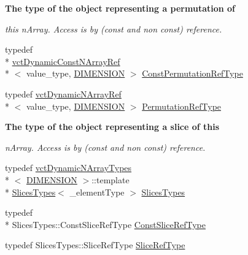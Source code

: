 \begin{Indent}{\bf The type of the object representing a permutation of}\par
{\em this n\-Array. Access is by (const and non const) reference. }\begin{DoxyCompactItemize}
\item 
typedef \\*
\hyperlink{classvct_dynamic_const_n_array_ref}{vct\-Dynamic\-Const\-N\-Array\-Ref}\\*
$<$ value\-\_\-type, \hyperlink{classvct_dynamic_const_n_array_base_a815ac316ebc1bb2ab1969d307549826faf759c9ab831ff929b89af4ea2865a378}{D\-I\-M\-E\-N\-S\-I\-O\-N} $>$ \hyperlink{classvct_dynamic_const_n_array_base_a412fcb88d50ea2e1d809efab113968fc}{Const\-Permutation\-Ref\-Type}
\item 
typedef \hyperlink{classvct_dynamic_n_array_ref}{vct\-Dynamic\-N\-Array\-Ref}\\*
$<$ value\-\_\-type, \hyperlink{classvct_dynamic_const_n_array_base_a815ac316ebc1bb2ab1969d307549826faf759c9ab831ff929b89af4ea2865a378}{D\-I\-M\-E\-N\-S\-I\-O\-N} $>$ \hyperlink{classvct_dynamic_const_n_array_base_a968acf814b972b47aa2ea39105e67fb3}{Permutation\-Ref\-Type}
\end{DoxyCompactItemize}
\end{Indent}
\begin{Indent}{\bf The type of the object representing a slice of this}\par
{\em n\-Array. Access is by (const and non const) reference. }\begin{DoxyCompactItemize}
\item 
typedef \hyperlink{classvct_dynamic_n_array_types}{vct\-Dynamic\-N\-Array\-Types}\\*
$<$ \hyperlink{classvct_dynamic_const_n_array_base_a815ac316ebc1bb2ab1969d307549826faf759c9ab831ff929b89af4ea2865a378}{D\-I\-M\-E\-N\-S\-I\-O\-N} $>$\-::template \\*
\hyperlink{classvct_dynamic_const_n_array_base_a1f4ce8ed9fda0d5d1704f66799a55279}{Slices\-Types}$<$ \-\_\-element\-Type $>$ \hyperlink{classvct_dynamic_const_n_array_base_a1f4ce8ed9fda0d5d1704f66799a55279}{Slices\-Types}
\item 
typedef \\*
Slices\-Types\-::\-Const\-Slice\-Ref\-Type \hyperlink{classvct_dynamic_const_n_array_base_ad4a09eb0789ba4c5b8d799fbe0ee3d79}{Const\-Slice\-Ref\-Type}
\item 
typedef Slices\-Types\-::\-Slice\-Ref\-Type \hyperlink{classvct_dynamic_const_n_array_base_a4170184942c320b2402ba8dfdab9a915}{Slice\-Ref\-Type}
\end{DoxyCompactItemize}
\end{Indent}
